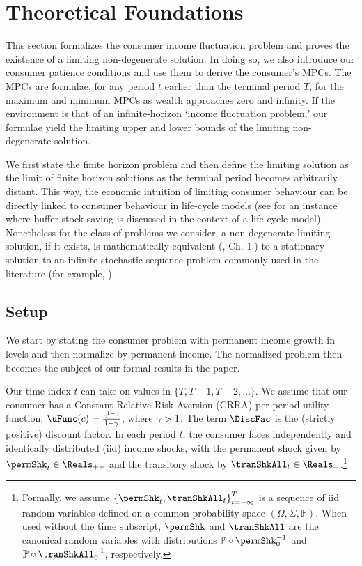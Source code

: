 \documentclass[BufferStockTheory]{subfiles}
\begin{document}
\hypertarget{The-Problem}{}
\section{Theoretical Foundations}\label{sec:Theory}

This section formalizes the consumer income fluctuation problem and proves the existence of a limiting non-degenerate solution. In doing so, we also introduce our consumer patience conditions and use them to derive the consumer's MPCs. The MPCs are formulae, for any period $t$ earlier than the terminal period $T$, for the maximum and minimum MPCs as wealth approaches zero and infinity.  If the environment is that of an infinite-horizon `income fluctuation problem,' our formulae yield the limiting upper and lower bounds of the limiting non-degenerate solution.



We first state the finite horizon problem and then define the limiting solution as the limit of finite horizon solutions as the terminal period becomes arbitrarily distant. This way, the economic intuition of limiting consumer behaviour can be directly linked to consumer behaviour in life-cycle models (see \cite{gpLifeCycle} for an instance where buffer stock saving is discussed in the context of a life-cycle model). Nonetheless for the class of problems we consider, a non-degenerate limiting solution, if it exists, is mathematically equivalent (\cite{bertsekas2012dynamic}, Ch. 1.) to a stationary solution to an infinite stochastic sequence problem commonly used in the literature (for example, \cite{mstIncFluct}). 

\label{sec:Foundations}
\subsection{Setup}\label{subsec:Setup}

We start by stating the consumer problem with permanent income growth in levels and then normalize by permanent income. The normalized problem then becomes the subject of our formal results in the paper. 

Our time index $t$ can take on values in $\{T,T-1,T-2,\dots \}$. We assume that our consumer has a Constant Relative Risk Aversion (CRRA) per-period utility function, $\uFunc(c)=\frac{c^{1-\CRRA}}{1-\CRRA}$, where $\gamma>1$. The term $\DiscFac$ is the (strictly positive) discount factor. In each period $t$, the consumer faces independently and identically distributed (iid) income shocks, with the permanent shock given by $\permShk_{t} \in \Reals_{++}$ and the transitory shock by $\tranShkAll_{t} \in \Reals_{+}$.\footnote{Formally, we assume $\left\{\permShk_{t},\tranShkAll_{t}\right\}_{t=-\infty}^{T}$ is a sequence of iid random variables defined on a common probability space $(\Omega, \Sigma, \mathbb{P})$. When used without the time subscript, $\permShk$ and $\tranShkAll$ are the canonical random variables with distributions $\mathbb{P}\circ \permShk_{0}^{-1}$ and $\mathbb{P}\circ \tranShkAll_{0}^{-1}$, respectively.}
\end{document}
